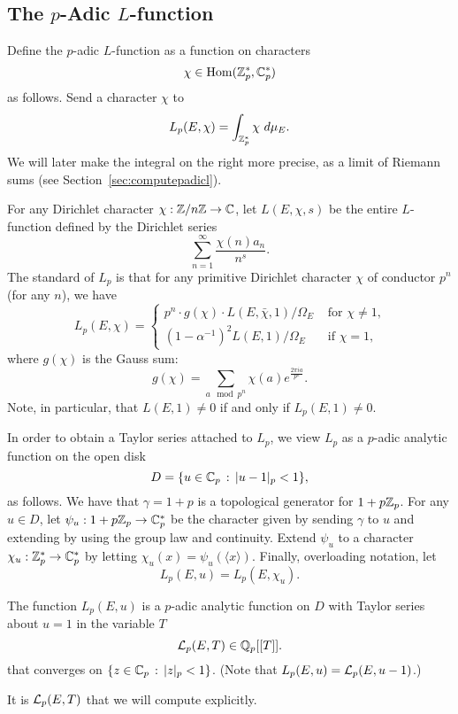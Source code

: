 \subsection{The $p$-Adic $L$-function}
Define the $p$-adic $L$-function as a function on characters
$$
   \chi \in \operatorname{Hom}(\mathbb{Z}_p^*,\mathbb{C}_p^*)
$$
as follows.
Send a character $\chi$ to
$$
  L_p(E,\chi) = \int_{\mathbb{Z}_p^*} \chi\,\, d \mu_E.
$$
We will later make the integral on the right more
precise, as a limit of Riemann sums (see Section~\ref{sec:computepadicl}).


\begin{remark}\label{rm:interp}
For any Dirichlet character $\chi:\mathbb{Z}/n\mathbb{Z}\to\mathbb{C}$, let
$L(E,\chi,s)$ be the entire $L$-function defined by
the Dirichlet series 
$$
   \sum_{n=1}^{\infty} \frac{\chi(n) a_n }{n^s}.
$$
The standard  of $L_p$ is that for
any primitive
Dirichlet character $\chi$ of conductor $p^n$ (for any $n$), we
have
\begin{equation}\label{eq:interp}
L_p(E,\chi) = 
\begin{cases}
p^{n} \cdot g(\chi) \cdot L(E,\bar{\chi},1)/\Omega_E
& \text{ for $\chi\neq 1$,}\\
(1-\alpha^{-1})^2 L(E,1)/\Omega_E & \text{ if $\chi = 1$},
\end{cases}
\end{equation}
where $g(\chi)$ is the Gauss sum:
$$
 g(\chi) =  \sum_{a \mod p^n} \chi(a) e^{\frac{2\pi i a}{p^n}}.
$$
Note, in particular, that $L(E,1)\neq 0$ if and only
if $L_p(E,1)\neq 0$.
\end{remark}


In order to obtain a Taylor series attached
to $L_p$, we view $L_p$ as a $p$-adic analytic function on 
the open disk
$$
  D = \{u \in \mathbb{C}_p \, : \, |u-1|_p < 1 \},
$$
as follows.   We have that $\gamma=1+p$ is a topological generator 
for $1+p\mathbb{Z}_p$.  For any $u\in D$, let $\psi_u:1+p\mathbb{Z}_p \to \mathbb{C}_p^*$
be the character given by sending $\gamma$ to $u$ and
extending by using the group law and continuity.
Extend $\psi_u$ to a character $\chi_u:\mathbb{Z}_p^* \to \mathbb{C}_p^*$
by letting $\chi_u(x) = \psi_u(\langle x \rangle)$.
Finally, overloading notation, let
$$
  L_p(E,u) = L_p(E,\chi_u).
$$


\begin{theorem}\label{thm:padiclseries}
The function $L_p(E,u)$ is a $p$-adic analytic function 
on $D$ with  Taylor series
about $u=1$ in the variable $T$
$$
   \mathcal{L}_p(E,T) \in \mathbb{Q}_p[[T]].
$$
that converges on $\{z \in \mathbb{C}_p\, :\,  |z|_p < 1\}$.
(Note that $L_p(E,u) = \mathcal{L}_p(E, u-1)$.)
\end{theorem}
It is $\mathcal{L}_p(E,T)$ that we will compute explicitly.

